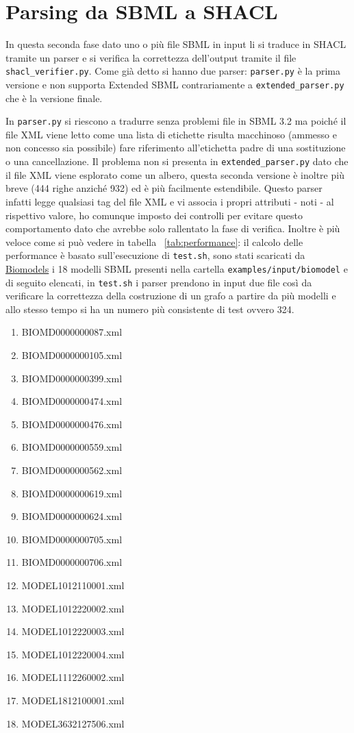 \documentclass{article}
\begin{document}
\clearpage
\section{Parsing da SBML a SHACL}

In questa seconda fase dato uno o più file SBML in input li si traduce in SHACL tramite un parser e si verifica la correttezza dell'output tramite il file \texttt{shacl\_verifier.py}. Come già detto si hanno due parser: \texttt{parser.py} è la prima versione e non supporta Extended SBML contrariamente a \texttt{extended\_parser.py} che è la versione finale. 

In \texttt{parser.py} si riescono a tradurre senza problemi file in SBML 3.2 ma poiché il file XML viene letto come una lista di etichette risulta macchinoso (ammesso e non concesso sia possibile) fare riferimento all'etichetta padre di una sostituzione o una cancellazione. Il problema non si presenta in \texttt{extended\_parser.py} dato che il file XML viene esplorato come un albero, questa seconda versione è inoltre più breve (444 righe anziché 932) ed è più facilmente estendibile. Questo parser infatti legge qualsiasi tag del file XML e vi associa i propri attributi - noti - al rispettivo valore, ho comunque imposto dei controlli per evitare questo comportamento dato che avrebbe solo rallentato la fase di verifica. Inoltre è più veloce come si può vedere in tabella ~\ref{tab:performance}: il calcolo delle performance è basato sull'esecuzione di \texttt{test.sh}, sono stati scaricati da \href{https://www.ebi.ac.uk/biomodels/}{Biomodels} i 18 modelli SBML presenti nella cartella \texttt{examples/input/biomodel} e di seguito elencati, in \texttt{test.sh} i parser prendono in input due file così da verificare la correttezza della costruzione di un grafo a partire da più modelli e allo stesso tempo si ha un numero più consistente di test ovvero 324. 

\begin{enumerate}
    \item BIOMD0000000087.xml
    \item BIOMD0000000105.xml
    \item BIOMD0000000399.xml
    \item BIOMD0000000474.xml
    \item BIOMD0000000476.xml
    \item BIOMD0000000559.xml
    \item BIOMD0000000562.xml
    \item BIOMD0000000619.xml
    \item BIOMD0000000624.xml
    \item BIOMD0000000705.xml
    \item BIOMD0000000706.xml
    \item MODEL1012110001.xml
    \item MODEL1012220002.xml
    \item MODEL1012220003.xml
    \item MODEL1012220004.xml
    \item MODEL1112260002.xml
    \item MODEL1812100001.xml
    \item MODEL3632127506.xml
\end{enumerate}
\end{document}

